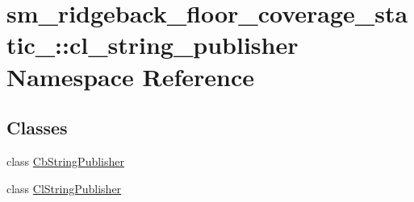 \hypertarget{namespacesm__ridgeback__floor__coverage__static__1_1_1cl__string__publisher}{}\section{sm\+\_\+ridgeback\+\_\+floor\+\_\+coverage\+\_\+static\+\_\+:\+:cl\+\_\+string\+\_\+publisher Namespace Reference}
\label{namespacesm__ridgeback__floor__coverage__static__1_1_1cl__string__publisher}
\subsection*{Classes}
\begin{DoxyCompactItemize}
\item 
class \hyperlink{classsm__ridgeback__floor__coverage__static__1_1_1cl__string__publisher_1_1CbStringPublisher}{Cb\+String\+Publisher}
\item 
class \hyperlink{classsm__ridgeback__floor__coverage__static__1_1_1cl__string__publisher_1_1ClStringPublisher}{Cl\+String\+Publisher}
\end{DoxyCompactItemize}
